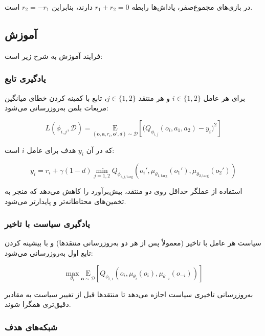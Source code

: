 در بازی‌های مجموع­‌صفر، پاداش‌ها رابطه $r_1 + r_2 = 0$ دارند، بنابراین $r_2 = -r_1$ است.

\subsection{آموزش }

فرایند آموزش  به شرح زیر است:

\subsubsection{یادگیری تابع }

برای هر عامل $i \in \{1, 2\}$ و هر منتقد $j \in \{1, 2\}$، تابع  با کمینه کردن خطای میانگین مربعات بلمن به‌روزرسانی می‌شود:

\begin{equation}
    L(\phi_{i,j}, \mathcal{D}) = \underset{(\boldsymbol{o}, \boldsymbol{a}, r_i, \boldsymbol{o}', d) \sim \mathcal{D}}{\mathrm{E}}\left[ 
    \Bigg( Q_{\phi_{i,j}}(o_i, a_1, a_2) - y_i \Bigg)^2
    \right]
\end{equation}

که در آن $y_i$ هدف برای عامل $i$ است:

\begin{equation}
    y_i = r_i + \gamma (1 - d) \min_{j=1,2} Q_{\phi_{i,j,\text{targ}}}(o_i', \mu_{\theta_{1,\text{targ}}}(o_1'), \mu_{\theta_{2,\text{targ}}}(o_2'))
\end{equation}

استفاده از عملگر حداقل روی دو منتقد، بیش‌برآورد را کاهش می‌دهد که منجر به تخمین‌های محتاطانه‌تر و پایدارتر می‌شود.

\subsubsection{یادگیری سیاست با تاخیر}

سیاست هر عامل با تاخیر (معمولاً پس از هر دو به‌روزرسانی منتقدها) و با بیشینه کردن تابع  اول به‌روزرسانی می‌شود:

\begin{equation}
    \max_{\theta_i} \underset{\boldsymbol{o} \sim \mathcal{D}}{\mathrm{E}}\left[ Q_{\phi_{i,1}}(o_i, \mu_{\theta_i}(o_i), \mu_{\theta_{-i}}(o_{-i})) \right]
\end{equation}

به‌روزرسانی تاخیری سیاست اجازه می‌دهد تا منتقدها قبل از تغییر سیاست به مقادیر دقیق‌تری همگرا شوند.

\subsubsection{شبکه‌های هدف}

